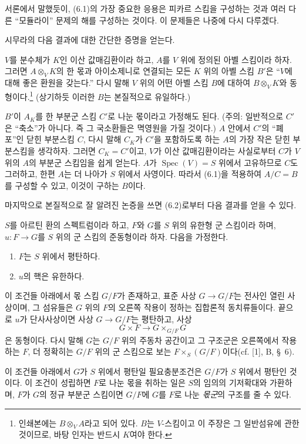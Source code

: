 
서론에서 말했듯이, (6.1)의 가장 중요한 응용은 피카르 스킴을 구성하는
것과 여러 다른 ``모듈라이'' 문제의 해를 구성하는 것이다. 이 문제들은
나중에 다시 다루겠다.

시무라의 다음 결과에 대한 간단한 증명을 얻는다.

 $V$를 분수체가 $K$인 이산 값매김환이라 하고,
$A$를 $V$ 위에 정의된 아벨 스킴이라 하자. 그러면
$A\otimes_V K$의 한 몫과 아이소제니로 연결되는 모든 $K$ 위의 아벨 스킴
$B'$은 ``$V$에 대해 좋은 환원을 갖는다.'' 다시 말해 $V$ 위의 어떤 아벨
스킴 $B$에 대하여 $B\otimes_V K$와 동형이다.\footnote{인쇄본에는
$B\otimes_V A$라고 되어 있다. $B$는 $V$-스킴이고 이 주장은 그 일반섬유에
관한 것이므로, 바탕 인자는 반드시 $K$여야 한다.} (상기하듯 이러한 $B$는
본질적으로 유일하다.)

$B'$이 $A_K$를 한 부분군 스킴 $C'$로 나눈 몫이라고 가정해도 된다.
(주의: 일반적으로 $C'$은 ``축소''가 아니다. 즉 그 국소환들은 멱영원을
가질 것이다.) $A$ 안에서 $C'$의 ``폐포''인 닫힌 부분스킴 $C$, 다시 말해
$C_K$가 $C'$을 포함하도록 하는 $A$의 가장 작은 닫힌 부분스킴을 생각하자.
그러면 $C_K=C'$이고, $V$가 이산 값매김환이라는 사실로부터 $C$가 $V$ 위의
$A$의 부분군 스킴임을 쉽게 얻는다. $A$가
$\operatorname{Spec}(V)=S$ 위에서 고유하므로 $C$도 그러하고, 한편 $A$는
더 나아가 $S$ 위에서 사영이다. 따라서 (6.1)을 적용하여 $A/C=B$를
구성할 수 있고,
이것이 구하는 $B$이다.

마지막으로 본질적으로 잘 알려진 논증을 쓰면 (6.2)로부터 다음 결과를
얻을 수 있다.

 $S$를 아르틴 환의 스펙트럼이라 하고, $F$와 $G$를
$S$ 위의 유한형 군 스킴이라 하며, $u:F\to G$를 $S$ 위의 군 스킴의
준동형이라 하자. 다음을 가정한다.
\begin{enumerate}
\item[(i)] $F$는 $S$ 위에서 평탄하다.
\item[(ii)] $u$의 핵은 유한하다.
\end{enumerate}
이 조건들 아래에서 몫 스킴 $G/F$가 존재하고, 표준 사상 $G\to G/F$는
전사인 열린 사상이며, 그 섬유들은 $G$ 위의 $F$의 오른쪽 작용이 정하는
집합론적 동치류들이다. 끝으로 $u$가 단사사상이면 사상 $G\to G/F$는
평탄하고, 사상
\[
  G\times F\longrightarrow G\times_{G/F}G
\]
은 동형이다. 다시 말해 $G$는 $G/F$ 위의 주동차 공간이고 그 구조군은
오른쪽에서 작용하는 $F$, 더 정확히는 $G/F$ 위의 군 스킴으로 보는
$F\times_S(G/F)$이다(cf. [1], B, \S~6).

 이 조건들 아래에서 $G$가 $S$ 위에서 평탄일
필요충분조건은 $G/F$가 $S$ 위에서 평탄인 것이다. 이 조건이 성립하면
$F$로 나눈 몫을 취하는 일은 $S$의 임의의 기저확대와 가환하며, $F$가
$G$의 정규 부분군 스킴이면 $G/F$에 $G$를 $F$로 나눈
\emph{몫군}의 구조를 줄 수 있다.

